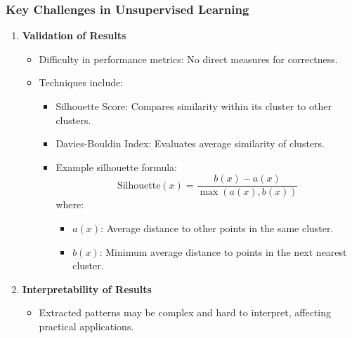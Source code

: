 \documentclass[aspectratio=169]{beamer}
\begin{document}
\begin{frame}[fragile]
    \frametitle{Key Challenges in Unsupervised Learning}
    \begin{enumerate}
        \item \textbf{Validation of Results}
        \begin{itemize}
            \item Difficulty in performance metrics: No direct measures for correctness.
            \item Techniques include:
            \begin{itemize}
                \item Silhouette Score: Compares similarity within its cluster to other clusters.
                \item Davies-Bouldin Index: Evaluates average similarity of clusters.
                \item Example silhouette formula:
                \begin{equation}
                    \text{Silhouette}(x) = \frac{b(x) - a(x)}{\max(a(x), b(x))}
                \end{equation}
                where:
                \begin{itemize}
                    \item \( a(x) \): Average distance to other points in the same cluster.
                    \item \( b(x) \): Minimum average distance to points in the next nearest cluster.
                \end{itemize}
            \end{itemize}
        \end{itemize}
        \item \textbf{Interpretability of Results}
        \begin{itemize}
            \item Extracted patterns may be complex and hard to interpret, affecting practical applications.
        \end{itemize}
    \end{enumerate}
\end{frame}
\end{document}
